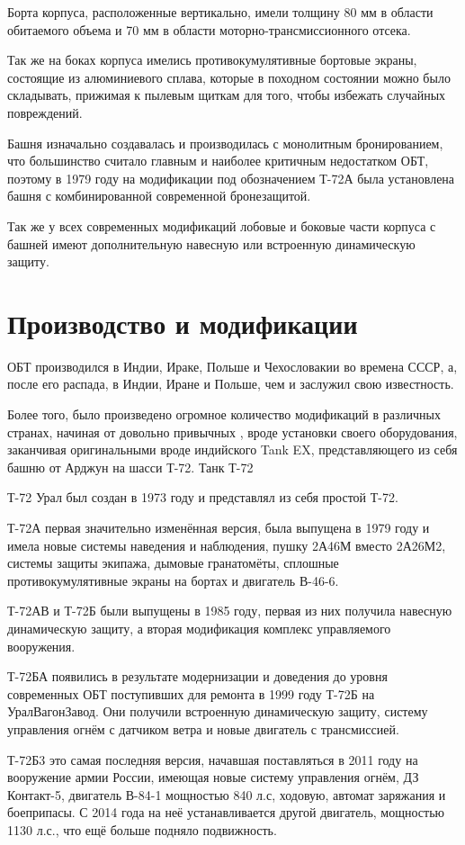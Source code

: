 Борта корпуса, расположенные вертикально, имели толщину 80 мм в области обитаемого объема и 70 мм в области моторно-трансмиссионного отсека.

Так же на боках корпуса имелись противокумулятивные бортовые экраны, состоящие из алюминиевого сплава, которые в походном состоянии можно было складывать, прижимая к пылевым щиткам для того, чтобы избежать случайных повреждений.

Башня изначально создавалась и производилась с монолитным бронированием, что большинство считало главным и наиболее критичным недостатком ОБТ, поэтому в 1979 году на модификации под обозначением Т-72А была установлена башня с комбинированной современной бронезащитой.

Так же у всех современных модификаций лобовые и боковые части корпуса с башней имеют дополнительную навесную или встроенную динамическую защиту.

\section{Производство и модификации}

	ОБТ производился в Индии, Ираке, Польше и Чехословакии во времена СССР, а, после его распада, в Индии, Иране и Польше, чем и заслужил свою известность.

Более того, было произведено огромное количество модификаций в различных странах, начиная от довольно привычных , вроде установки своего оборудования, заканчивая оригинальными вроде индийского Tank EX, представляющего из себя башню от Арджун на шасси Т-72.
Танк Т-72

Т-72 Урал был создан в 1973 году и представлял из себя простой Т-72.

Т-72А первая значительно изменённая версия, была выпущена в 1979 году и имела новые системы наведения и наблюдения, пушку 2А46М вместо 2А26М2, системы защиты экипажа, дымовые гранатомёты, сплошные противокумулятивные экраны на бортах и двигатель В-46-6.

Т-72АВ и Т-72Б были выпущены в 1985 году, первая из них получила навесную динамическую защиту, а вторая модификация комплекс управляемого вооружения.

Т-72БА появились в результате модернизации и доведения до уровня современных ОБТ поступивших для ремонта в 1999 году Т-72Б на УралВагонЗавод. Они получили встроенную динамическую защиту, систему управления огнём с датчиком ветра и новые двигатель с трансмиссией.

Т-72Б3 это самая последняя версия, начавшая поставляться в 2011 году на вооружение армии России, имеющая новые систему управления огнём, ДЗ Контакт-5, двигатель В-84-1 мощностью 840 л.с, ходовую, автомат заряжания и боеприпасы. С 2014 года на неё устанавливается другой двигатель, мощностью 1130 л.с., что ещё больше подняло подвижность.

